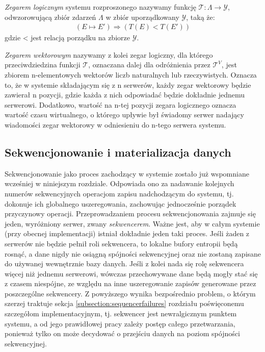 
\textit{Zegarem logicznym} systemu rozproszonego nazywamy funkcję $ \mathcal{T}: \Lambda \rightarrow \mathcal{Y} $, odwzorowującą zbiór zdarzeń $ \Lambda $ w zbiór uporządkowany $ \mathcal{Y} $, taką że:
\begin{align*}
    (E \mapsto E') \Rightarrow (T(E) < T(E'))    
\end{align*}
gdzie < jest relacją porządku na zbiorze $ \mathcal{Y} $.

\textit{Zegarem wektorowym} nazywamy z kolei zegar logiczny, dla którego przeciwdziedzina funkcji $ \mathcal{T} $, oznaczana dalej dla odróżnienia przez $ \mathcal{T}^V $, jest zbiorem n-elementowych wektorów liczb naturalnych lub rzeczywistych. Oznacza to, że w systemie składającym się z n serwerów, każdy zegar wektorowy będzie zawierał n pozycji, gdzie każda z nich odpowiadać będzie dokładnie jednemu serwerowi. Dodatkowo, wartość na n-tej pozycji zegara logicznego oznacza wartość czasu wirtualnego, o którego upływie był świadomy serwer nadający wiadomości zegar wektorowy w odniesieniu do n-tego serwera systemu.

\subsection{Sekwencjonowanie i materializacja danych} \label{section:materialization}


Sekwencjonowanie jako proces zachodzący w systemie zostało już wspomniane wcześniej w niniejszym rozdziale. Odpowiada ono za nadawanie kolejnych numerów sekwencyjnych operacjom zapisu nadchodzącym do systemu, tj. dokonuje ich globalnego uszeregowania, zachowując jednocześnie porządek przyczynowy operacji. Przeprowadzaniem procesu sekwencjonowania zajmuje się jeden, wyróżniony serwer, zwany \textit{sekwencerem}. Ważne jest, aby w całym systemie (przy obecnej implementacji) istniał dokładnie jeden taki proces. Jeśli żaden z serwerów nie będzie pełnił roli sekwencera, to lokalne bufory entropii będą rosnąć, a dane nigdy nie osiągną spójności sekwencyjnej oraz nie zostaną zapisane do używanej wewnętrznie bazy danych. Jeśli z kolei nada się rolę sekwencera więcej niż jednemu serwerowi, wówczas przechowywane dane będą mogły stać się z czasem niespójne, ze względu na inne uszeregowanie zapisów generowane przez poszczególne sekwencery. Z powyższego wynika bezpośrednio problem, o którym szerzej traktuje sekcja \ref{subsection:sequencerfailures} rozdziału poświęconemu szczegółom implementacyjnym, tj. sekwencer jest newralgicznym punktem systemu, a od jego prawidłowej pracy zależy postęp całego przetwarzania, ponieważ tylko on może decydować o przejściu danych na poziom spójności sekwencyjnej.

